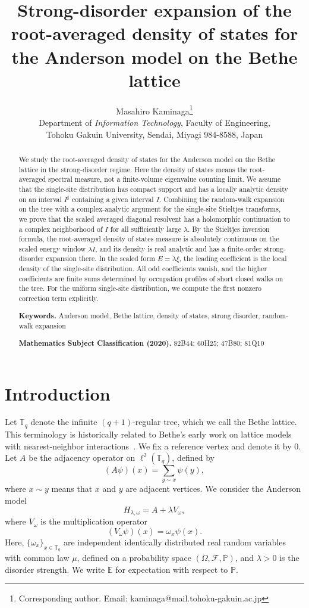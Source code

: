 \documentclass[a4paper,11pt]{article}
\title{Strong-disorder expansion of the root-averaged density of states
for the Anderson model on the Bethe lattice}
\author{%
Masahiro Kaminaga\thanks{Corresponding author. Email: kaminaga@mail.tohoku-gakuin.ac.jp}\\
{\small Department of \textit{Information Technology}, Faculty of Engineering,}\\
{\small Tohoku Gakuin University, Sendai, Miyagi 984-8588, Japan}\\
}
\date{}
\begin{document}
\maketitle

\begin{abstract}
We study the root-averaged density of states for the Anderson model on
the Bethe lattice in the strong-disorder regime. 
Here the density of states means the root-averaged spectral measure, 
not a finite-volume eigenvalue counting limit. 
We assume that the single-site distribution
has compact support and has a locally analytic density on an interval
$I^\sharp$ containing a given interval $I$. 
Combining the random-walk expansion on the tree with a complex-analytic argument for the
single-site Stieltjes transforms, 
we prove that the scaled averaged diagonal resolvent has a holomorphic continuation 
to a complex neighborhood of $I$ for all sufficiently large $\lambda$. 
By the Stieltjes inversion formula, the root-averaged density of states
measure is absolutely continuous on the scaled energy window $\lambda I$,
and its density is real analytic and has a finite-order strong-disorder expansion there.
In the scaled form $E=\lambda\xi$, the leading coefficient 
is the local density of the single-site distribution. 
All odd coefficients vanish, and the higher coefficients are finite sums 
determined by occupation profiles of short closed walks on the tree. 
For the uniform single-site distribution, 
we compute the first nonzero correction term explicitly.

\medskip
\noindent\textbf{Keywords.}
Anderson model, Bethe lattice, density of states, strong disorder, random-walk expansion

\medskip
\noindent\textbf{Mathematics Subject Classification (2020).}
82B44; 60H25; 47B80; 81Q10
\end{abstract}



\section{Introduction}

Let $\mathbb T_q$ denote the infinite $(q+1)$-regular tree,
which we call the Bethe lattice.
This terminology is historically related to Bethe's early work on lattice
models with nearest-neighbor interactions~\cite{Bethe1935}.
We fix a reference vertex and denote it by $0$.
Let $A$ be the adjacency operator on $\ell^2(\mathbb T_q)$, defined by
$$
(A\psi)(x)=\sum_{y\sim x}\psi(y),
$$
where $x\sim y$ means that $x$ and $y$ are adjacent vertices. 
We consider the Anderson model
$$
H_{\lambda,\omega}=A+\lambda V_\omega,
$$
where $V_\omega$ is the multiplication operator
$$
(V_\omega\psi)(x)=\omega_x\psi(x).
$$
Here, $\{\omega_x\}_{x\in\mathbb T_q}$ are independent identically
distributed real random variables with common law $\mu$, defined on a
probability space $(\Omega,\mathcal F,\mathbb P)$, and $\lambda>0$ is the disorder strength.
We write $\mathbb E$ for expectation with respect to $\mathbb P$.
\end{document}
